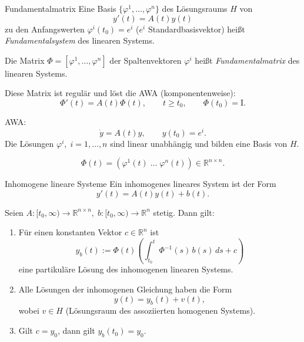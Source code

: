 \begin{definition}{Fundamentalmatrix}
    Eine Basis $\{\varphi^1,\dots,\varphi^n\}$ des Lösungsraums $H$ von
    $$
    y'(t)=A(t)y(t)
    $$
    zu den Anfangswerten $\varphi^i(t_0)=e^i$ ($e^i$ Standardbasisvektor) heißt \emph{Fundamentalsystem} des linearen Systems.

    Die Matrix $\Phi=[\varphi^1,\dots,\varphi^n]$ der Spaltenvektoren $\varphi^i$ heißt \emph{Fundamentalmatrix} des linearen Systems.
    \vspace{1em}

    Diese Matrix ist regulär und löst die AWA (komponentenweise):
    $$
    \Phi'(t)=A(t)\Phi(t),\qquad t\ge t_0,\qquad \Phi(t_0)=\mathrm{I}.
    $$

    \vspace{1ex}
    AWA:
    $$
    \dot y = A(t)y,\qquad y(t_0)=e^i.
    $$
    Die Lösungen $\varphi^i,\; i=1,\dots,n$ sind linear unabhängig und bilden eine Basis von $H$.

    $$
    \Phi(t)=(\varphi^1(t)\;\dots\;\varphi^n(t))\in\mathbb{R}^{n\times n}.
    $$   
\end{definition}

\begin{satz}{Inhomogene lineare Systeme}
    Ein inhomogenes lineares System ist der Form
    $$
    y'(t)=A(t)y(t)+b(t).
    $$

    Seien $A:[t_0,\infty)\to\mathbb{R}^{n\times n},\; b:[t_0,\infty)\to\mathbb{R}^n$ stetig. Dann gilt:

    \begin{enumerate}%
    \item Für einen konstanten Vektor $c\in\mathbb{R}^n$ ist
    $$
    y_b(t):=\Phi(t) \left(\int_{t_0}^t\Phi^{-1}(s)\,b(s)\,ds + c\right)
    $$
    eine partikuläre Lösung des inhomogenen linearen Systems.

    \item Alle Lösungen der inhomogenen Gleichung haben die Form
    $$
    y(t)=y_b(t)+v(t),
    $$
    wobei $v\in H$ (Lösungsraum des assoziierten homogenen Systems).

    \item Gilt $c=y_0$, dann gilt $y_b(t_0)=y_0$.
    \end{enumerate} 
\end{satz}